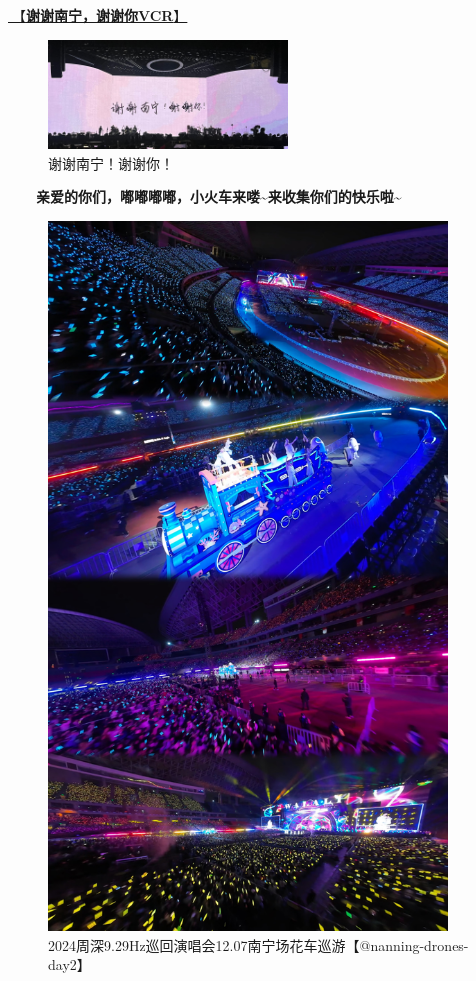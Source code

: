 \documentclass[]{ctexbook}
\begin{document}
\hyperref[thank-you-vcr]{🎥【\textbf{谢谢南宁，谢谢你VCR}】}

\begin{figure}

{\centering \includegraphics[width=180pt]{img/nanning20241207/thank-nanning} 

}

\caption{谢谢南宁！谢谢你！}\label{fig:unnamed-chunk-146}
\end{figure}

  \textbf{亲爱的你们，嘟嘟嘟嘟，小火车来喽\textasciitilde 来收集你们的快乐啦\textasciitilde{}}

\begin{figure}

{\centering \includegraphics[width=300pt]{img/nanning20241207/002} 

}

\caption{2024周深9.29Hz巡回演唱会12.07南宁场花车巡游【@nanning-drones-day2】}\label{fig:unnamed-chunk-147}
\end{figure}
\end{document}
